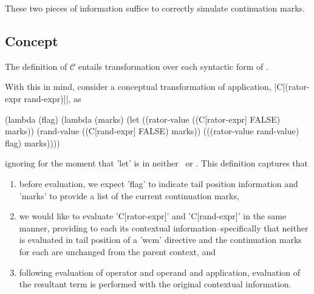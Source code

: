 
These two pieces of information suffice to correctly simulate continuation marks.

\subsection{Concept}

The definition of $\mathcal{C}$ entails transformation over each syntactic form of \cm.

With this in mind, consider a conceptual transformation of application, \scheme|C[(rator-expr rand-expr)]|, as
\begin{schemeblock}
\begin{schemedisplay}
(lambda (flag)
  (lambda (marks)
    (let ((rator-value ((C[rator-expr] FALSE) marks))
          (rand-value ((C[rand-expr] FALSE) marks))
      (((rator-value rand-value) flag) marks))))
\end{schemedisplay}
\end{schemeblock}
ignoring for the moment that \scheme'let' is in neither \lv\ or \cm. This definition captures that
\begin{enumerate}
\item before evaluation, we expect \scheme'flag' to indicate tail position information and \scheme'marks' to provide a list of the current continuation marks,
\item we would like to evaluate \scheme'C[rator-expr]' and \scheme'C[rand-expr]' in the same manner, providing to each its contextual information--specifically that neither is evaluated in tail position of a \scheme'wcm' directive and the continuation marks for each are unchanged from the parent context, and
\item following evaluation of operator and operand and application, evaluation of the resultant term is performed with the original contextual information.
\end{enumerate}

